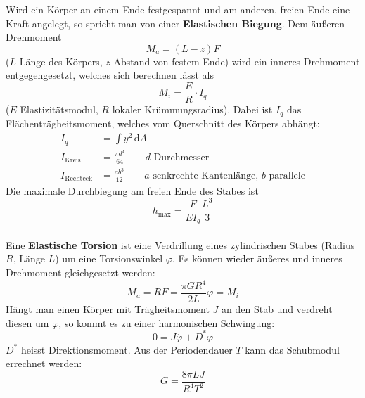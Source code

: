 Wird ein Körper an einem Ende festgespannt und am anderen, freien Ende eine Kraft angelegt, so spricht man von einer \textbf{Elastischen Biegung}.
Dem äußeren Drehmoment
\begin{equation}
  M_a=(L-z)F
  \label{eq:drehmom}
\end{equation}
($L$ Länge des Körpers, $z$ Abstand von festem Ende) wird ein inneres Drehmoment entgegengesetzt, welches sich berechnen lässt als
\begin{equation}
  M_i=\frac{E}{R}\cdot I_q
  \label{eq:in_drehmom}
\end{equation}
($E$ Elastizitätsmodul, $R$ lokaler Krümmungsradius). Dabei ist $I_q$ das Flächenträgheitsmoment, welches vom Querschnitt des Körpers abhängt:
\begin{align}
  I_q &= \int y^2 \, \mathrm{d}A \\
  I_{\text{Kreis}}&=\frac{\pi d^4}{64} \qquad \text{$d$ Durchmesser} \\
  I_{\text{Rechteck}}&=\frac{ab^3}{12} \qquad \text{$a$ senkrechte Kantenlänge, $b$ parallele}
  \label{eq:flaechentraegheit}
\end{align}
Die maximale Durchbiegung am freien Ende des Stabes ist
\begin{equation}
  h_{\text{max}}=\frac{F}{E I_q}\frac{L^3}{3}
  \label{eq:maxbiegung}
\end{equation}
\\
Eine \textbf{Elastische Torsion} ist eine Verdrillung eines zylindrischen Stabes (Radius $R$, Länge $L$) um eine Torsionswinkel $\varphi$. Es können wieder äußeres und inneres Drehmoment gleichgesetzt werden:
\begin{equation}
  M_a = RF=\frac{\pi G R^4}{2L}\varphi=M_i
  \label{eq:torsion_drehmom}
\end{equation}
Hängt man einen Körper mit Trägheitsmoment $J$ an den Stab und verdreht diesen um $\varphi$, so kommt es zu einer harmonischen Schwingung:
\begin{equation}
  0=J\ddot{\varphi}+D^* \varphi
  \label{eq:schwingung}
\end{equation}
$D^*$ heisst Direktionsmoment. Aus der Periodendauer $T$ kann das Schubmodul errechnet werden:
\begin{equation}
  G= \frac{8\pi LJ}{R^4T^2}
  \label{eq:schubmod}
\end{equation}

